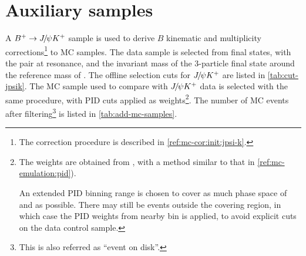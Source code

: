 \section{Auxiliary samples}
\label{ref:sel:aux}

A ${{{B}^+}} \rightarrow {\ensuremath{{J\mskip -3mu/\mskip -2mu\psi}}} {\ensuremath{{K}^+}}$ sample is used to derive $B$ kinematic and
multiplicity corrections\footnote{
    The correction procedure is described in \cref{ref:mc-cor:init:jpsi-k}.
} to MC samples.
The data sample is selected from \mup\mun\Kp final states, with the \mup\mun
pair at \jpsi resonance,
and the invariant mass of the 3-particle final state around the reference mass
of \Bp.
The offline selection cuts for ${{J\mskip -3mu/\mskip -2mu\psi}}{{K}^+}$ are listed in
\cref{tab:cut-jpsik}.
The MC sample used to compare with ${{J\mskip -3mu/\mskip -2mu\psi}} {{K}^+}$ data is selected with the same
procedure, with PID cuts applied as weights\footnote{
    The weights are obtained from \pidcalib, with a method similar to that in
    \cref{ref:mc-emulation:pid}).

    An extended PID binning range is chosen to cover as much phase space of
    \kaon and \muon as possible.
    There may still be events outside the covering region, in which case the PID
    weights from nearby bin is applied,
    to avoid explicit cuts on the \jpsi\kaon data control sample.
}.
The number of MC events after filtering\footnote{
    This is also referred as ``event on disk''.
} is listed in \cref{tab:add-mc-samples}.

